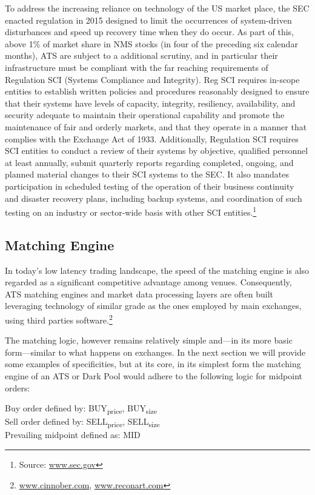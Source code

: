 To address the increasing reliance on technology of the US market place, the SEC enacted regulation in 2015 designed to limit the occurrences of system-driven disturbances and speed up recovery time when they do occur. As part of this, above 1\% of market share in NMS stocks (in four of the preceding six calendar months), ATS are subject to a additional scrutiny, and in particular their infrastructure must be compliant with the far reaching requirements of Regulation SCI (Systems Compliance and Integrity). Reg SCI requires in-scope entities to establish written policies and procedures reasonably designed to ensure that their systems have levels of capacity, integrity, resiliency, availability, and security adequate to maintain their operational capability and promote the maintenance of fair and orderly markets, and that they operate in a manner that complies with the Exchange Act of 1933. Additionally, Regulation SCI requires SCI entities to conduct a review of their systems by objective, qualified personnel at least annually, submit quarterly reports regarding completed, ongoing, and planned material changes to their SCI systems to the SEC. It also mandates participation in scheduled testing of the operation of their business continuity and disaster recovery plans, including backup systems, and coordination of such testing on an industry or sector-wide basis with other SCI entities.\footnote{Source: \url{www.sec.gov}}



\subsection{Matching Engine}


In today's low latency trading landscape, the speed of the matching engine is also regarded as a significant competitive advantage among venues. Consequently, ATS  matching engines and market data processing layers are often built leveraging technology of similar grade as the ones employed by main exchanges, using third parties software.\footnote{\url{www.cinnober.com}, \url{www.reconart.com}}


The matching logic, however remains relatively simple and---in its more basic form---similar to what happens on exchanges. In the next section we will provide some examples of specificities, but at its core, in its simplest form the matching engine of an ATS or Dark Pool would adhere to the following logic for midpoint orders:


\noindent Buy order defined by: BUY\textsubscript{price}, BUY\textsubscript{size} \\
\noindent Sell order defined by: SELL\textsubscript{price}, SELL\textsubscript{size}  \\
\noindent Prevailing midpoint defined as: MID \\

